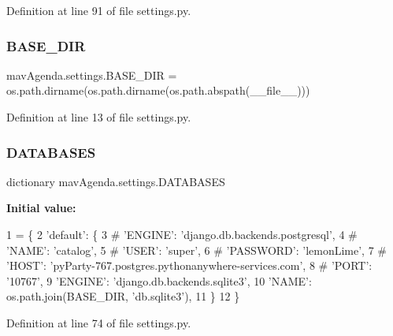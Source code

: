 Definition at line 91 of file settings.\+py.

\mbox{\label{namespacemavAgenda_1_1settings_a4c1c25aebe0c84efbeb882ae68410153}} 
\subsubsection{\texorpdfstring{B\+A\+S\+E\+\_\+\+D\+IR}{BASE\_DIR}}
{\footnotesize\ttfamily mav\+Agenda.\+settings.\+B\+A\+S\+E\+\_\+\+D\+IR = os.\+path.\+dirname(os.\+path.\+dirname(os.\+path.\+abspath(\+\_\+\+\_\+file\+\_\+\+\_\+)))}



Definition at line 13 of file settings.\+py.

\mbox{\label{namespacemavAgenda_1_1settings_a90bba01c6fcb83baced6119ef2086795}} 
\subsubsection{\texorpdfstring{D\+A\+T\+A\+B\+A\+S\+ES}{DATABASES}}
{\footnotesize\ttfamily dictionary mav\+Agenda.\+settings.\+D\+A\+T\+A\+B\+A\+S\+ES}

{\bfseries Initial value\+:}
\begin{DoxyCode}
1 =  \{
2     \textcolor{stringliteral}{'default'}: \{
3      \textcolor{comment}{#   'ENGINE': 'django.db.backends.postgresql',}
4      \textcolor{comment}{#   'NAME': 'catalog',}
5      \textcolor{comment}{#   'USER': 'super',}
6      \textcolor{comment}{#   'PASSWORD': 'lemonLime',}
7      \textcolor{comment}{#   'HOST': 'pyParty-767.postgres.pythonanywhere-services.com',}
8      \textcolor{comment}{#   'PORT': '10767',}
9         \textcolor{stringliteral}{'ENGINE'}: \textcolor{stringliteral}{'django.db.backends.sqlite3'},
10         \textcolor{stringliteral}{'NAME'}: os.path.join(BASE\_DIR, \textcolor{stringliteral}{'db.sqlite3'}),
11     \}
12 \}
\end{DoxyCode}


Definition at line 74 of file settings.\+py.

